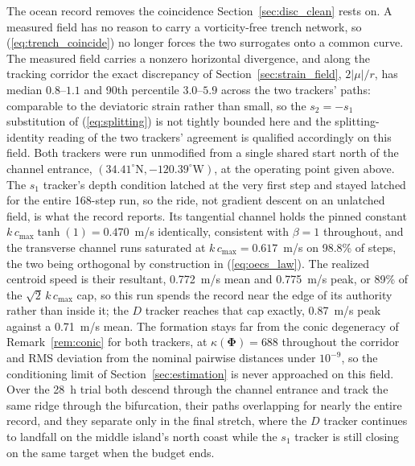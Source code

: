 \documentclass[lettersize,journal]{IEEEtran}
\begin{document}
The ocean record removes the coincidence Section~\ref{sec:disc_clean} rests
on. A measured field has no reason to carry a vorticity-free trench
network, so (\ref{eq:trench_coincide}) no longer forces the two surrogates
onto a common curve. The measured field carries a nonzero horizontal
divergence, and along the tracking corridor the exact discrepancy of
Section~\ref{sec:strain_field}, $2|\mu|/r$, has median $0.8$--$1.1$ and
90th percentile $3.0$--$5.9$ across the two trackers' paths: comparable
to the deviatoric strain rather than small, so the $s_2 = -s_1$
substitution of (\ref{eq:splitting}) is not tightly bounded here and the
splitting-identity reading of the two trackers' agreement is qualified
accordingly on this field. Both trackers were run unmodified from a single shared
start north of the channel entrance,
$(34.41^{\circ}\mathrm{N}, -120.39^{\circ}\mathrm{W})$, at the operating
point given above. The $s_1$ tracker's depth condition
latched at the very first step and stayed latched for the entire
168-step run, so the ride, not gradient descent on an unlatched field, is
what the record reports. Its tangential channel holds the pinned
constant $k\,c_{\max}\tanh(1) = 0.470$~m/s identically, consistent with
$\beta = 1$ throughout, and the transverse channel runs saturated at
$k\,c_{\max} = 0.617$~m/s on 98.8\% of steps, the two being orthogonal
by construction in (\ref{eq:oecs_law}). The realized centroid speed is
their resultant, 0.772~m/s mean and 0.775~m/s peak, or 89\% of the
$\sqrt{2}\,k\,c_{\max}$ cap, so this run spends the record near the
edge of its authority rather than inside it; the $D$ tracker reaches
that cap exactly, 0.87~m/s peak against a 0.71~m/s mean. The formation
stays far from the conic degeneracy of Remark~\ref{rem:conic} for both
trackers, at $\kappa(\boldsymbol{\Phi}) = 688$ throughout the corridor
and RMS deviation from the nominal pairwise distances under $10^{-9}$,
so the conditioning limit of Section~\ref{sec:estimation} is never
approached on this field.
Over the 28~h trial both descend through
the channel entrance and track the same ridge through the bifurcation,
their paths overlapping for nearly the entire record, and they separate
only in the final stretch, where the $D$ tracker continues to landfall on
the middle island's north coast while the $s_1$ tracker is still closing on
the same target when the budget ends.
\end{document}
